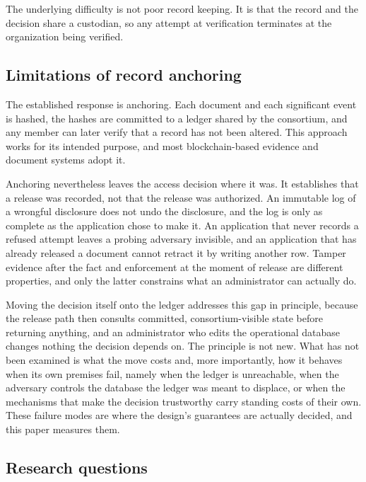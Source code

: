 \documentclass[preprint,12pt]{elsarticle}
\begin{document}
The underlying difficulty is not poor record keeping. It is that the record and
the decision share a custodian, so any attempt at verification terminates at
the organization being verified.

\subsection{Limitations of record anchoring}
\label{sec:anchoring_insufficient}

The established response is anchoring. Each document and each significant event
is hashed, the hashes are committed to a ledger shared by the consortium, and
any member can later verify that a record has not been altered. This approach
works for its intended purpose, and most blockchain-based evidence and document
systems adopt it.

Anchoring nevertheless leaves the access decision where it was. It establishes
that a release was recorded, not that the release was authorized. An immutable
log of a wrongful disclosure does not undo the disclosure, and the log is only
as complete as the application chose to make it. An application that never
records a refused attempt leaves a probing adversary invisible, and an
application that has already released a document cannot retract it by writing
another row. Tamper evidence after the fact and enforcement at the moment of
release are different properties, and only the latter constrains what an
administrator can actually do.

Moving the decision itself onto the ledger addresses this gap in principle,
because the release path then consults committed, consortium-visible state
before returning anything, and an administrator who edits the operational
database changes nothing the decision depends on. The principle is not new.
What has not been examined is what the move costs and, more importantly, how it
behaves when its own premises fail, namely when the ledger is unreachable, when
the adversary controls the database the ledger was meant to displace, or when
the mechanisms that make the decision trustworthy carry standing costs of their
own. These failure modes are where the design's guarantees are actually
decided, and this paper measures them.

\subsection{Research questions}
\label{sec:rqs}
\end{document}
